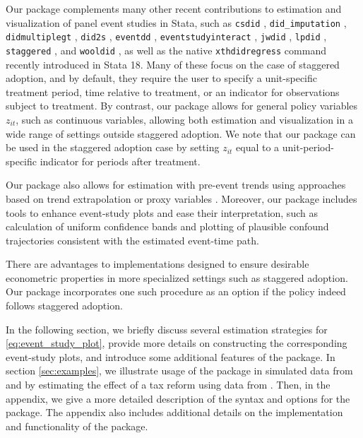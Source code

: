 \documentclass[12pt]{article}
\begin{document}
\sloppypar Our package complements many other recent contributions to estimation and visualization of panel event studies in Stata, such as \texttt{csdid} \citep{csdid}, \mbox{\texttt{did\_imputation}} \citep{didimputation}, \texttt{didmultiplegt} \citep{didmultiplegt}, \texttt{did2s} \citep{did2s}, \texttt{eventdd} \citep{eventddsj}, \mbox{\texttt{eventstudyinteract}} \citep{eventstudyinteract}, \texttt{jwdid} \citep{jwdid}, \texttt{lpdid} \citep{lpdid}, \mbox{\texttt{staggered}} \citep{staggered}, and \texttt{wooldid} \citep{wooldid}, as well as the native \mbox{\texttt{xthdidregress}} command recently introduced in Stata 18.
Many of these focus on the case of staggered adoption, and by default, they require the user to specify a unit-specific treatment period, time relative to treatment, or an indicator for observations subject to treatment.
By contrast, our package allows for general policy variables $z_{it}$, such as continuous variables, allowing both estimation and visualization in a wide range of settings outside staggered adoption.
We note that our package can be used in the staggered adoption case by setting $z_{it}$ equal to a unit-period-specific indicator for periods after treatment.

Our package also allows for estimation with pre-event trends using approaches based on trend extrapolation \citep{dobkin2018economic} or proxy variables \citep{freyaldenhoven2019pre}.
Moreover, our package includes tools to enhance event-study plots and ease their interpretation, such as calculation of uniform confidence bands and plotting of plausible confound trajectories consistent with the estimated event-time path.

There are advantages to implementations designed to ensure desirable econometric properties in more specialized settings such as staggered adoption.
Our package incorporates one such procedure as an option if the policy indeed follows staggered adoption.


In the following section, we briefly discuss several estimation strategies for \eqref{eq:event_study_plot}, provide more details on constructing the corresponding event-study plots, and introduce some additional features of the \xtevent package.
In section \ref{sec:examples}, we illustrate usage of the package in simulated data from \citet{freyaldenhoven2021visualizationforth} and by estimating the effect of a tax reform using data from \citet{martinez2022mobility}. 
Then, in the appendix, we give a more detailed description of the syntax and options for the \xtevent package.
The appendix also includes additional details on the implementation and functionality of the package.
\end{document}
